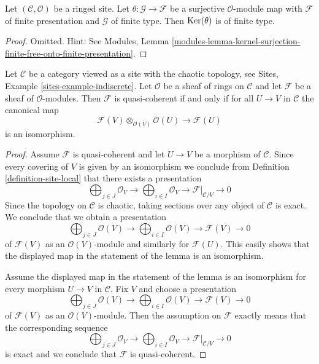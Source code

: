 \begin{lemma}
\label{lemma-kernel-surjection-finite-onto-finite-presentation}
Let $(\mathcal{C}, \mathcal{O})$ be a ringed site.
Let $\theta : \mathcal{G} \to \mathcal{F}$ be a surjective
$\mathcal{O}$-module map with $\mathcal{F}$ of finite presentation
and $\mathcal{G}$ of finite type. Then $\mathop{\mathrm{Ker}}(\theta)$ is of finite type.
\end{lemma}

\begin{proof}
Omitted. Hint: See Modules, Lemma
\ref{modules-lemma-kernel-surjection-finite-free-onto-finite-presentation}.
\end{proof}

\begin{lemma}
\label{lemma-chaotic-quasi-coherent}
Let $\mathcal{C}$ be a category viewed as a site with the chaotic
topology, see Sites, Example \ref{sites-example-indiscrete}. Let $\mathcal{O}$
be a sheaf of rings on $\mathcal{C}$ and let $\mathcal{F}$ be a sheaf
of $\mathcal{O}$-modules. Then $\mathcal{F}$ is quasi-coherent if
and only if for all $U \to V$ in $\mathcal{C}$ the canonical map
$$
\mathcal{F}(V) \otimes_{\mathcal{O}(V)} \mathcal{O}(U)
\longrightarrow
\mathcal{F}(U)
$$
is an isomorphism.
\end{lemma}

\begin{proof}
Assume $\mathcal{F}$ is quasi-coherent and let $U \to V$ be a morphism
of $\mathcal{C}$. Since every covering of $V$ is given by an isomorphism
we conclude from Definition \ref{definition-site-local}
that there exists a presentation
$$
\bigoplus\nolimits_{j \in J} \mathcal{O}_V \longrightarrow
\bigoplus\nolimits_{i \in I} \mathcal{O}_V \longrightarrow
\mathcal{F}|_{\mathcal{C}/V} \longrightarrow 0
$$
Since the topology on $\mathcal{C}$ is chaotic, taking sections over
any object of $\mathcal{C}$ is exact. We conclude that we obtain
a presentation
$$
\bigoplus\nolimits_{j \in J} \mathcal{O}(V) \longrightarrow
\bigoplus\nolimits_{i \in I} \mathcal{O}(V) \longrightarrow
\mathcal{F}(V) \longrightarrow 0
$$
of $\mathcal{F}(V)$ as an $\mathcal{O}(V)$-module and similarly for
$\mathcal{F}(U)$. This easily shows that the displayed map in the statement
of the lemma is an isomorphism.

\medskip\noindent
Assume the displayed map in the statement of the lemma is an isomorphism
for every morphism $U \to V$ in $\mathcal{C}$. Fix $V$ and choose a
presentation
$$
\bigoplus\nolimits_{j \in J} \mathcal{O}(V) \longrightarrow
\bigoplus\nolimits_{i \in I} \mathcal{O}(V) \longrightarrow
\mathcal{F}(V) \longrightarrow 0
$$
of $\mathcal{F}(V)$ as an $\mathcal{O}(V)$-module. Then the assumption
on $\mathcal{F}$ exactly means that the corresponding sequence
$$
\bigoplus\nolimits_{j \in J} \mathcal{O}_V \longrightarrow
\bigoplus\nolimits_{i \in I} \mathcal{O}_V \longrightarrow
\mathcal{F}|_{\mathcal{C}/V} \longrightarrow 0
$$
is exact and we conclude that $\mathcal{F}$ is quasi-coherent.
\end{proof}

